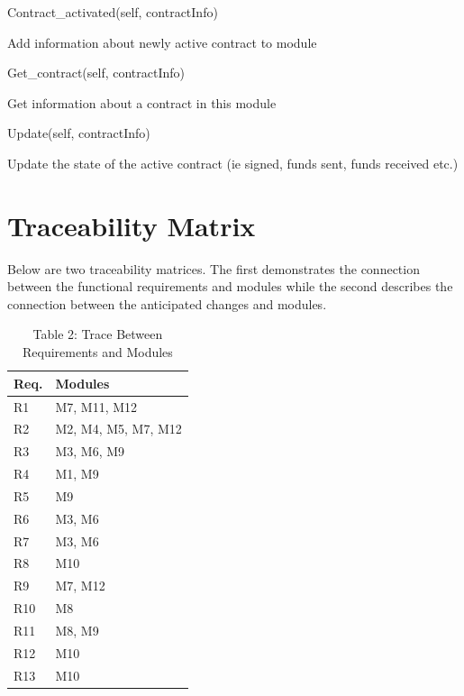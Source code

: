 \documentclass{article}
\begin{document}
    Contract_activated(self, contractInfo) 

        Add information about newly active contract to module 

    Get_contract(self, contractInfo) 

        Get information about a contract in this module 

    Update(self, contractInfo) 

        Update the state of the active contract (ie signed, funds sent, funds received etc.)
\fi

\section*{Traceability Matrix}

Below are two traceability matrices. The first demonstrates the connection between the functional requirements and modules while the second describes the connection between the anticipated changes and modules.

\begin{table}[h!]
	\centering
	\begin{tabular}{p{} p{}}
		\toprule
		\textbf{Req.} & \textbf{Modules}\\
		\midrule
		R1 & M7, M11, M12\\
		R2 & M2, M4, M5, M7, M12\\
		R3 & M3, M6, M9\\
		R4 & M1, M9\\
		R5 & M9\\
		R6 & M3, M6\\
		R7 & M3, M6\\
		R8 & M10\\
		R9 & M7, M12\\
		R10 & M8\\ %
		R11 & M8, M9 \\ %
		R12 & M10\\
		R13 & M10\\
		\bottomrule
	\end{tabular}
	\caption{Table 2: Trace Between Requirements and Modules}
	
\end{table}
\end{document}
